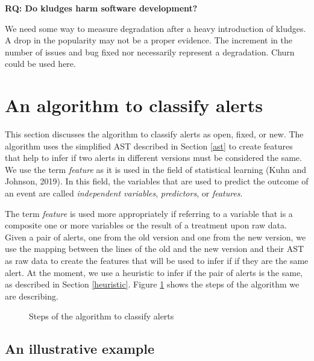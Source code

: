 \documentclass[
]{article}
\begin{document}
\noindent \textbf{RQ: Do kludges harm software development?}
\label{kludge_harm}

We need some way to measure degradation after a heavy introduction of
kludges. A drop in the popularity may not be a proper evidence. The
increment in the number of issues and bug fixed nor necessarily
represent a degradation. Churn could be used here.


\section{An algorithm to classify alerts}
\label{alg}

This section discusses the algorithm to classify alerts as open, fixed,
or new. The algorithm uses the simplified AST described in Section
\ref{ast} to create features that help to infer if two alerts in
different versions must be considered the same. We use the term
\textit{feature} as it is used in the field of statistical learning
(Kuhn and Johnson, 2019). In this field, the variables that are used to
predict the outcome of an event are called \emph{independent variables},
\emph{predictors}, or \emph{features}.

The term \emph{feature} is used more appropriately if referring to a
variable that is a composite one or more variables or the result of a
treatment upon raw data. Given a pair of alerts, one from the old
version and one from the new version, we use the mapping between the
lines of the old and the new version and their AST as raw data to create
the features that will be used to infer if if they are the same alert.
At the moment, we use a heuristic to infer if the pair of alerts is the
same, as described in Section \ref{heuristic}. Figure \ref{fig:diag}
shows the steps of the algorithm we are describing.

\begin{figure}
  \centering
  \caption{Steps of the algorithm to classify alerts}\label{fig:diag}
\end{figure}

\subsection{An illustrative example}\label{source_used}
\end{document}
